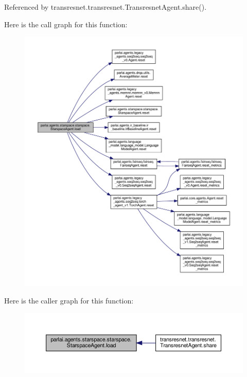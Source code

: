 Referenced by transresnet.\+transresnet.\+Transresnet\+Agent.\+share().

Here is the call graph for this function\+:
\nopagebreak
\begin{figure}[H]
\begin{center}
\leavevmode
\includegraphics[width=350pt]{classparlai_1_1agents_1_1starspace_1_1starspace_1_1StarspaceAgent_a57f2fcd5e04246f3d8edf57ccdb99eab_cgraph}
\end{center}
\end{figure}
Here is the caller graph for this function\+:
\nopagebreak
\begin{figure}[H]
\begin{center}
\leavevmode
\includegraphics[width=350pt]{classparlai_1_1agents_1_1starspace_1_1starspace_1_1StarspaceAgent_a57f2fcd5e04246f3d8edf57ccdb99eab_icgraph}
\end{center}
\end{figure}
\mbox{\label{classparlai_1_1agents_1_1starspace_1_1starspace_1_1StarspaceAgent_a788b504ead65ec6af074717226cc07bb}} 
